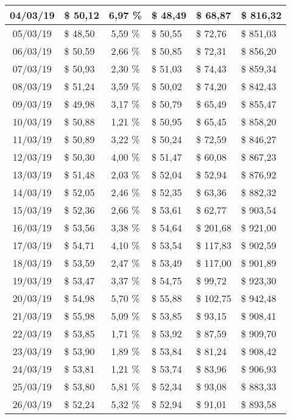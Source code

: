 \begin{center}
\begin{small}
\begin{longtable}{|c|l|c|l|l|l|}
04/03/19 & \$ 50,12 & 6,97 \% & \$ 48,49 & \$ 68,87 & \$ 816,32 \\ \hline
05/03/19 & \$ 48,50 & 5,59 \% & \$ 50,55 & \$ 72,76 & \$ 851,03 \\ \hline
06/03/19 & \$ 50,59 & 2,66 \% & \$ 50,85 & \$ 72,31 & \$ 856,20 \\ \hline
07/03/19 & \$ 50,93 & 2,30 \% & \$ 51,03 & \$ 74,43 & \$ 859,34 \\ \hline
08/03/19 & \$ 51,24 & 3,59 \% & \$ 50,02 & \$ 74,20 & \$ 842,43 \\ \hline
09/03/19 & \$ 49,98 & 3,17 \% & \$ 50,79 & \$ 65,49 & \$ 855,47 \\ \hline
10/03/19 & \$ 50,88 & 1,21 \% & \$ 50,95 & \$ 65,45 & \$ 858,20 \\ \hline
11/03/19 & \$ 50,89 & 3,22 \% & \$ 50,24 & \$ 72,59 & \$ 846,27 \\ \hline
12/03/19 & \$ 50,30 & 4,00 \% & \$ 51,47 & \$ 60,08 & \$ 867,23 \\ \hline
13/03/19 & \$ 51,48 & 2,03 \% & \$ 52,04 & \$ 52,94 & \$ 876,92 \\ \hline
14/03/19 & \$ 52,05 & 2,46 \% & \$ 52,35 & \$ 63,36 & \$ 882,32 \\ \hline
15/03/19 & \$ 52,36 & 2,66 \% & \$ 53,61 & \$ 62,77 & \$ 903,54 \\ \hline
16/03/19 & \$ 53,56 & 3,38 \% & \$ 54,64 & \$ 201,68 & \$ 921,00 \\ \hline
17/03/19 & \$ 54,71 & 4,10 \% & \$ 53,54 & \$ 117,83 & \$ 902,59 \\ \hline
18/03/19 & \$ 53,59 & 2,47 \% & \$ 53,49 & \$ 117,00 & \$ 901,89 \\ \hline
19/03/19 & \$ 53,47 & 3,37 \% & \$ 54,75 & \$ 99,72 & \$ 923,30 \\ \hline
20/03/19 & \$ 54,98 & 5,70 \% & \$ 55,88 & \$ 102,75 & \$ 942,48 \\ \hline
21/03/19 & \$ 55,98 & 5,09 \% & \$ 53,85 & \$ 93,15 & \$ 908,41 \\ \hline
22/03/19 & \$ 53,85 & 1,71 \% & \$ 53,92 & \$ 87,59 & \$ 909,70 \\ \hline
23/03/19 & \$ 53,90 & 1,89 \% & \$ 53,84 & \$ 81,24 & \$ 908,42 \\ \hline
24/03/19 & \$ 53,81 & 1,21 \% & \$ 53,74 & \$ 83,96 & \$ 906,93 \\ \hline
25/03/19 & \$ 53,80 & 5,81 \% & \$ 52,34 & \$ 93,08 & \$ 883,33 \\ \hline
26/03/19 & \$ 52,24 & 5,32 \% & \$ 52,94 & \$ 91,01 & \$ 893,58 \\ \hline

\end{longtable}
\end{small}
\end{center}
